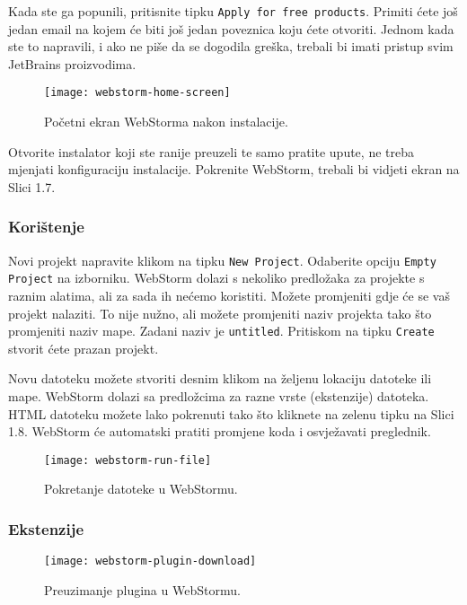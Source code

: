 Kada ste ga popunili, pritisnite tipku \verb|Apply for free products|.
Primiti ćete još jedan email na kojem će biti još jedan poveznica koju ćete otvoriti.
Jednom kada ste to napravili, i ako ne piše da se dogodila greška, trebali bi imati pristup svim JetBrains proizvodima.

\begin{figure}[h]\label{fig:figure3}
    \texttt{[image: webstorm-home-screen]}
    \caption{Početni ekran WebStorma nakon instalacije.}
\end{figure}

Otvorite instalator koji ste ranije preuzeli te samo pratite upute, ne treba mjenjati konfiguraciju instalacije.
Pokrenite WebStorm, trebali bi vidjeti ekran na Slici 1.7.

\subsubsection{Korištenje}

Novi projekt napravite klikom na tipku \verb|New Project|.
Odaberite opciju \verb|Empty Project| na izborniku.
WebStorm dolazi s nekoliko predložaka za projekte s raznim alatima, ali za sada ih nećemo koristiti.
Možete promjeniti gdje će se vaš projekt nalaziti.
To nije nužno, ali možete promjeniti naziv projekta tako što promjeniti naziv mape.
Zadani naziv je \verb |untitled|.
Pritiskom na tipku \verb|Create| stvorit ćete prazan projekt.

Novu datoteku možete stvoriti desnim klikom na željenu lokaciju datoteke ili mape.
WebStorm dolazi sa predložcima za razne vrste (ekstenzije) datoteka.
HTML datoteku možete lako pokrenuti tako što kliknete na zelenu tipku na Slici 1.8.
WebStorm će automatski pratiti promjene koda i osvježavati preglednik.

\begin{figure}[h]
    \texttt{[image: webstorm-run-file]}
    \caption{Pokretanje datoteke u WebStormu.}\label{fig:figure5}
\end{figure}

\subsubsection{Ekstenzije}

\begin{figure}[h]
    \texttt{[image: webstorm-plugin-download]}
    \caption{Preuzimanje plugina u WebStormu.}\label{fig:figure4}
\end{figure}

